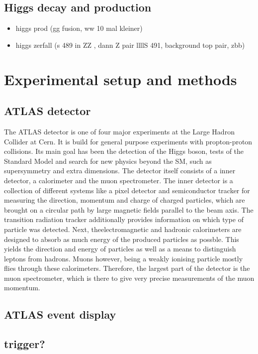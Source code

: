 \documentclass[twoside,        %
               BCOR12mm,       %
               ngerman,english, %
               fleqn,headsepline=false,footsepline=false
              ]{Vorlage/MFPREPORT}
\begin{document}
\subsection{Higgs decay and production}
\begin{itemize}
    \item higgs prod (gg fusion, ww 10 mal kleiner)
    \item higgs zerfall (s 489 in ZZ , dann Z pair llllS 491, background top
        pair, zbb)
\end{itemize}




\section{Experimental setup and methods}
\label{sec:setup}
\subsection{ATLAS detector}
The ATLAS detector is one of four major experiments at the Large Hadron
Collider at Cern. It is build for general purpose experiments with
propton-proton collisions. Its main goal has been the detection of the Higgs
boson, tests of the Standard Model and search for new physics beyond the SM,
such as supersymmetry and extra dimensions.
The detector itself consists of a inner detector, a calorimeter and the muon
spectrometer. The inner detector is a collection of different systems like a
pixel detector and semiconductor tracker for measuring the direction, momentum
and charge of charged particles, which are brought on a circular path by large
magnetic fields parallel to the beam axis. The transition radiation tracker
additionally provides information on which type of particle was detected. Next,
theelectromagnetic and hadronic calorimeters are designed to absorb as much
energy of the produced particles as possble. This yields the direction and
energy of particles as well as a means to distinguish leptons from hadrons. 
Muons however, being a weakly ionising particle mostly flies through these
calorimeters. Therefore, the largest part of the detector is the muon
spectrometer, which is there to give very precise measurements of the muon
momentum.
\subsection{ATLAS event display}
\subsection{trigger?}
\end{document}
